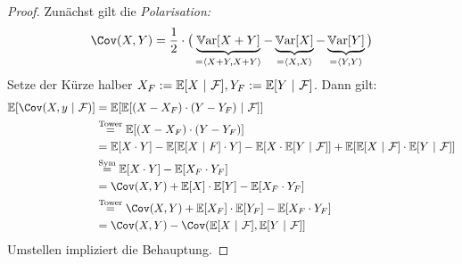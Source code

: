 \documentclass[12pt,a4paper]{article}
\begin{document}
\begin{proof}
Zunächst gilt die \textit{Polarisation:} 
\begin{align*}
\Cov(X,Y)=\frac{1}{2}\cdot\big(\underbrace{\Var[X+Y]}_{=\langle X+Y,X+Y\rangle}-\underbrace{\Var[X]}_{=\langle X,X\rangle}-\underbrace{\Var[Y]}_{=\langle Y,Y\rangle}\big)
\end{align*}
Setze der Kürze halber $X_F:=\mathbb{E}[X~|~\mathcal{F}], Y_F:=\mathbb{E}[Y~|~\mathcal{F}]$. Dann gilt:
\begin{align*}
\E[\Cov(X,y~|~\F)]
&=\E[\E[(X-X_F)\cdot(Y-Y_F)~|~\F]]\\
&\stackeq{\text{Tower}}
\E[(X-X_F)\cdot(Y-Y_F)]\\
&=\E[X\cdot Y]-\E[\E[X~|~F]\cdot Y]
-\E[X\cdot\E[Y~|~\F]]+\E[\E[X~|~\F]\cdot\E[Y~|~\F]]\\
&\stackeq{\text{Sym}}
\E[X\cdot Y]-\E[X_F\cdot Y_F]\\
&=\Cov(X,Y)+\E[X]\cdot\E[Y]-\E[X_F\cdot Y_F]\\
&\stackeq{\text{Tower}}
\Cov(X,Y)+\E[X_F]\cdot\E[Y_F]-\E[X_F\cdot Y_F]\\
&=\Cov(X,Y)-\Cov(\E[X~|~\F],\E[Y~|~\F]]
\end{align*}
Umstellen impliziert die Behauptung.
\end{proof}
\end{document}
